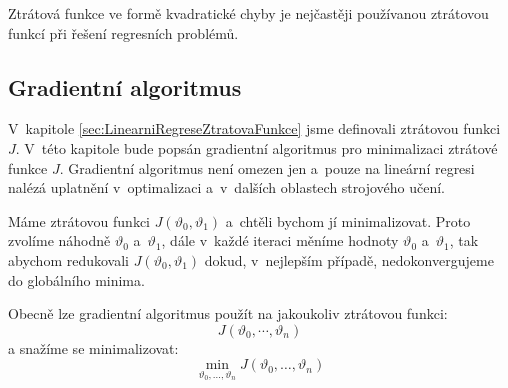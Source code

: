 \par{Ztrátová funkce ve formě kvadratické chyby je nejčastěji používanou ztrátovou funkcí při řešení regresních problémů.}





\newpage








\subsection{Gradientní algoritmus}
\label{sec:LinearniRegreseGradientDescent}

\par{V~kapitole \ref{sec:LinearniRegreseZtratovaFunkce} jsme definovali ztrátovou funkci $J$. V~této kapitole bude popsán gradientní algoritmus pro minimalizaci ztrátové funkce $J$. Gradientní algoritmus není omezen jen a~pouze na lineární regresi nalézá uplatnění v~optimalizaci a~v~dalších oblastech strojového učení.} 

\par{Máme ztrátovou funkci $J \left( \vartheta_0, \vartheta_1 \right)$ a~chtěli bychom jí minimalizovat. Proto zvolíme náhodně $\vartheta_0$ a~$\vartheta_1$, dále v~každé iteraci měníme hodnoty $\vartheta_0$ a~$\vartheta_1$, tak abychom redukovali $J \left( \vartheta_0, \vartheta_1 \right)$ dokud, v~nejlepším případě, nedokonvergujeme do globálního minima.}

\par{Obecně lze gradientní algoritmus použít na jakoukoliv ztrátovou funkci:
\begin{equation}
	J \left( \vartheta_0, \cdots, \vartheta_n \right)
\end{equation}
a snažíme se minimalizovat:
\begin{equation}
	\min_{\vartheta_0, \ldots, \vartheta_n} J \left( \vartheta_0, \ldots, \vartheta_n \right)
\end{equation}}

